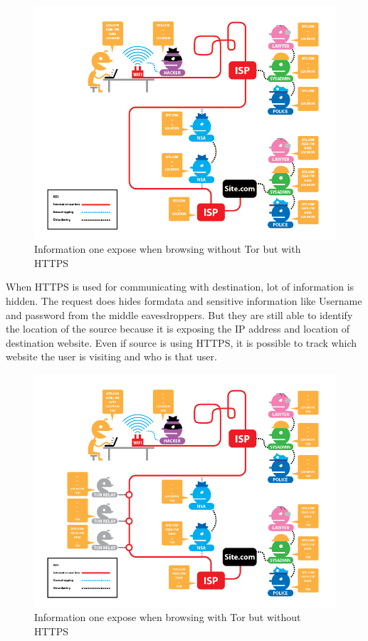 \documentclass{article}
\begin{document}
      \begin{figure}[h!]
        \includegraphics[width=\linewidth]{no_tor_yes_https.png}
        \caption{Information one expose when browsing without Tor but with HTTPS}
        \label{fig:no_https_no_tor}
      \end{figure}

      When HTTPS is used for communicating with destination, lot of information
      is hidden. The request does hides formdata and sensitive information like
      Username and password from the middle eavesdroppers. But they are still
      able to identify the location of the source because it is exposing the IP
      address and location of destination website. Even if source is using
      HTTPS, it is possible to track which website the user is visiting and who
      is that user.

      \begin{figure}[h!]
        \includegraphics[width=\linewidth]{yes_tor_no_https.png}
        \caption{Information one expose when browsing with Tor but without HTTPS}
        \label{fig:no_https_no_tor}
      \end{figure}
\end{document}
